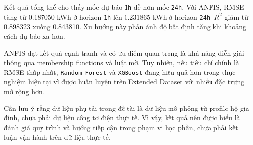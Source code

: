 Kết quả tổng thể cho thấy mốc dự báo \texttt{1h} dễ hơn mốc \texttt{24h}. Với ANFIS, RMSE tăng từ 0.187050 kWh ở horizon \texttt{1h} lên 0.231865 kWh ở horizon \texttt{24h}; $R^2$ giảm từ 0.898323 xuống 0.843810. Xu hướng này phản ánh độ bất định tăng khi khoảng cách dự báo xa hơn.

ANFIS đạt kết quả cạnh tranh và có ưu điểm quan trọng là khả năng diễn giải thông qua membership functions và luật mờ. Tuy nhiên, nếu tiêu chí chính là RMSE thấp nhất, \texttt{Random Forest} và \texttt{XGBoost} đang hiệu quả hơn trong thực nghiệm hiện tại vì được huấn luyện trên Extended Dataset với nhiều đặc trưng mở rộng hơn.

Cần lưu ý rằng dữ liệu phụ tải trong đề tài là dữ liệu mô phỏng từ profile hộ gia đình, chưa phải dữ liệu công tơ điện thực tế. Vì vậy, kết quả nên được hiểu là đánh giá quy trình và hướng tiếp cận trong phạm vi học phần, chưa phải kết luận vận hành trên dữ liệu thực tế.

